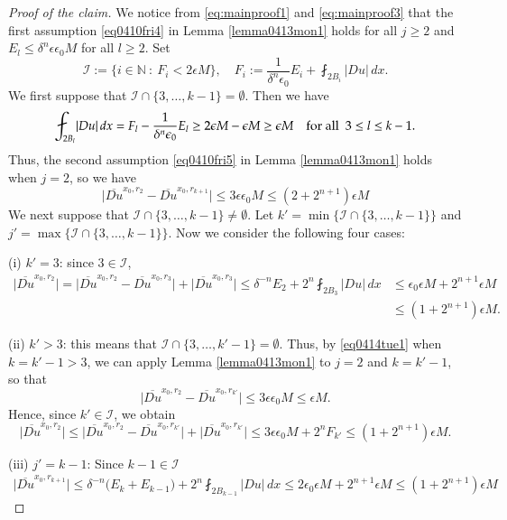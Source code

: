 \documentclass[reqno]{amsart}
\numberwithin{equation}{section}
\theoremstyle{plain}
\theoremstyle{definition}
\theoremstyle{remark}
\providecommand{\set}[1]{\{#1\}}
\providecommand{\bigset}[1]{\bigl\{#1\bigr\}}
\providecommand{\abs}[1]{\lvert#1\rvert}
\providecommand{\bigabs}[1]{\bigl\lvert#1\bigr\rvert}
\begin{document}
\begin{proof}[Proof of the claim]
We notice  from \eqref{eq:mainproof1} and \eqref{eq:mainproof3} that the first assumption \eqref{eq0410fri4} in Lemma \ref{lemma0413mon1}  holds for all $j\ge 2$ and $E_l \le \delta^n \epsilon \epsilon_0 M$ for all $l\ge 2$. Set
\[
\mathcal{I}:= \bigset{i\in \mathbb{N}~:~ F_i<2\epsilon M},
\quad F_{i}:= \frac{1}{\delta^n \epsilon_0} E_i+\fint_{2B_i} \abs{Du} \,dx.
\]
We first suppose that $\mathcal{I}\cap \set{  3,\ldots,k-1}=\emptyset$. Then we have
\begin{equation}\label{eq0414tue1}
\fint_{2B_l}\abs{Du} \, dx= F_l-\frac{1}{\delta^n\epsilon_0} E_l\geq 2\epsilon M-\epsilon M\geq \epsilon M\quad\hbox{for all $\ 3\leq l\leq k-1$}.
\end{equation}
Thus, the second assumption \eqref{eq0410fri5} in Lemma \ref{lemma0413mon1} holds when $j=2$, so we have
\[
\bigabs{ \overline{Du}^{x_0 ,r_2}  -\overline{Du}^{x_0 ,r_{k+1}}}\leq 3\epsilon\epsilon_0  M\leq (2+2^{n+1})\epsilon M
\]
We next suppose that $\mathcal{I}\cap \set{  3,\ldots,k-1}\neq\emptyset$. Let  $k' =\min \set {\mathcal{I}\cap \set{  3,\ldots,k-1}}$ and $j' =\max \set {\mathcal{I}\cap\set{ 3,\ldots,k-1}}$. Now we consider the following four cases:

(i) $k'=3 $:  since $3\in \mathcal{I}$,
\begin{align*}
\bigabs{ \overline{Du}^{x_0 ,r_{2}} }= \bigabs{ \overline{Du}^{x_0 ,r_{2}} -\overline{Du}^{x_0 ,r_{3}} }+\bigabs{ \overline{Du}^{x_0 ,r_{3}} }\leq \delta^{- n} E_2+ 2^{n}\fint_{2B_3} \abs{Du} \,dx
& \leq \epsilon_0 \epsilon M+2^{n+1}\epsilon M\\
& \le (1+2^{n+1})\epsilon M.
\end{align*}


(ii) $k'>3$:  this means that $\mathcal{I}\cap \set{  3,\ldots,k'-1}=\emptyset$.  Thus, by \eqref{eq0414tue1} when $k=k'-1> 3$, we can apply Lemma \ref{lemma0413mon1} to $j=2$ and $k=k'-1$, so that 
\[
\bigabs{ \overline{Du}^{x_0 ,r_2}  -\overline{Du}^{x_0 ,r_{k'}}}\leq 3\epsilon\epsilon_0  M \le \epsilon M.
\]
Hence, since $k'\in \mathcal{I}$, we obtain
\[
\bigabs{ \overline{Du}^{x_0 ,r_2}  }\leq \bigabs{ \overline{Du}^{x_0 ,r_2}  -\overline{Du}^{x_0 ,r_{k'}}}+\bigabs{  \overline{Du}^{x_0 ,r_{k'}}}\leq 3\epsilon\epsilon_0  M+ 2^n F_{k'}\leq (1+2^{n+1})\epsilon M.
\]


(iii) $j'=k-1$: Since $k-1\in\mathcal{I}$
\begin{align*}
\bigabs{ \overline{Du}^{x_0 ,r_{k+1}} }\leq \delta^{-n}\big( E_k+E_{k-1}\big)+ 2^{n}\fint_{2B_{k-1}} \abs{Du} \,dx \leq 2\epsilon_0 \epsilon M+2^{n+1}\epsilon M \le (1+2^{n+1})\epsilon M
\end{align*}



\end{proof}
\end{document}
